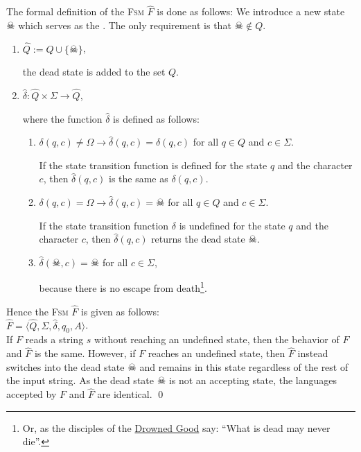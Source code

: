 The formal definition of the \textsc{Fsm} $\widehat{F}$ is done as follows:
We introduce a new state $\skull$ which serves as the .  The only requirement is that $\skull \not\in Q$.
\begin{enumerate}
\item $\widehat{Q} := Q \cup \{ \skull \}$,

      the dead state is added to the set  $Q$.
\item $\widehat{\delta} : \widehat{Q} \times \Sigma \rightarrow \widehat{Q}$,

      where the function $\widehat{\delta}$ is defined as follows:
      \begin{enumerate}
      \item $\delta(q,c) \not= \Omega \rightarrow \widehat{\delta}(q,c) = \delta(q,c)$ \quad  for all $q \in Q$ and $c \in \Sigma$.

            If the state transition function is defined for the state  $q$ and the character
            $c$, then $\widehat{\delta}(q,c)$ is the same as $\delta(q,c)$.
      \item $\delta(q,c) = \Omega \rightarrow \widehat{\delta}(q,c) = \skull$  \quad for all $q \in Q$ and $c \in \Sigma$.

            If the state transition function $\delta$ is undefined for the state $q$ and the character
            $c$, then $\widehat{\delta}(q,c)$ returns the dead state $\skull$.
      \item $\widehat{\delta}(\skull, c) = \skull$ \quad for all $c \in \Sigma$,

            because there is no escape from death\footnote{Or, as the disciples of the \href{https://gameofthrones.fandom.com/wiki/Drowned_God}{Drowned Good} say: ``What is dead may never die''.}.
      \end{enumerate}
\end{enumerate}
Hence the \textsc{Fsm}  $\widehat{F}$ is given as follows:
\\[0.2cm]
\hspace*{1.3cm}
$\widehat{F} = \langle \widehat{Q}, \Sigma, \widehat{\delta}, q_0, A \rangle$.
\\[0.2cm]
If  $F$ reads a string $s$ without reaching an undefined state, then the behavior of $F$ and $\widehat{F}$ is the same.
However, if $F$ reaches an undefined state, then $\widehat{F}$ instead switches into the dead state 
$\skull$ and remains in this state regardless of the rest of the input string.  As the dead state $\skull$
is not an accepting state, the languages accepted by  $F$ and $\widehat{F}$ are identical. \qed 

